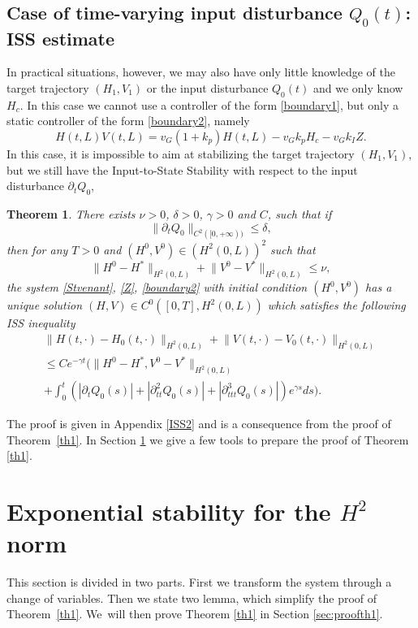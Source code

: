 \documentclass[11pt]{article}
\numberwithin{equation}{section}
\newtheorem{thm}{Theorem}[section]
\theoremstyle{definition}
\begin{document}
\subsection{Case of time-varying input disturbance $Q_{0}(t)$: ISS estimate}
In practical situations, however, we may also have only
little knowledge of the target trajectory $(H_{1},V_{1})$ or the input disturbance $Q_{0}(t)$ and we only know $H_{c}$. In this case we cannot use a controller of the form \eqref{boundary1},
but only a static controller of the form \eqref{boundary2}, namely\vspace*{-3pt}
\begin{equation*}
H(t,L)V(t,L)=v_{G}(1+k_{p})H(t,L)-v_{G}k_{p}H_{c}-v_{G}k_{I}Z.
\end{equation*}
In this case, it is impossible to aim at stabilizing the target trajectory $(H_{1},V_{1})$, but we still have the Input-to-State Stability with respect to the input disturbance $\partial_{t}Q_{0}$,
\begin{thm}
\label{th2}
There exists $\nu>0$, $\delta>0$, $\gamma>0$ and $C$, such that if\vspace*{-3pt}
\[
\lVert\partial_{t}Q_{0}\rVert_{C^{2}([0,+\infty))}\leq\delta,
\]
then for any $T>0$ and $(H^{0},V^{0})\in {(H^{2}(0,L))^{2}}$ such that\vspace*{-3pt}
\begin{equation*}
\lVert H^{0}-H^{*}\rVert_{H^{2}(0,L)}+\lVert V^{0}-V^{*}\rVert_{H^{2}(0,L)}\leq \nu,
\end{equation*}
the system \eqref{Stvenant}, \eqref{Z}, \eqref{boundary2} with initial condition $(H^{0},V^{0})$ has a unique solution $(H,V)\in C^{0}([0,T],H^{2}(0,L))$ which satisfies the following ISS inequality
\begin{multline}
\label{ISSHV}
\lVert H(t,\cdot)-H_{0}(t,\cdot)\rVert_{H^{2}(0,L)}+\lVert V(t,\cdot)-V_{0}(t,\cdot)\rVert_{H^{2}(0,L)}\\
\leq Ce^{-\gamma t}\biggl(\lVert H^{0}-H^{*},V^{0}-V^{*}\rVert_{H^{2}(0,L)}\\[-3pt]
+\int_{0}^{t}(|\partial_{t}Q_{0}(s)|+|\partial_{tt}^{2}Q_{0}(s)|+|\partial_{ttt}^{3}Q_{0}(s)|)e^{\gamma s}ds\biggr).
\end{multline}
\end{thm}
The proof is given in Appendix \ref{ISS2} and is a consequence from the proof of Theorem~\ref{th1}.
In Section \ref{s2} we {give a few tools to prepare the proof of} Theorem \ref{th1}.
\section{Exponential stability for the \texorpdfstring{$H^{2}$}{H2} norm}
\label{s2}
This section is divided in {two} parts. First we transform the system through a change of variables.
Then we state two lemma, which simplify the proof of Theorem~\ref{th1}.
{We~will then prove Theorem \ref{th1} in Section \ref{sec:proofth1}.}
\end{document}
